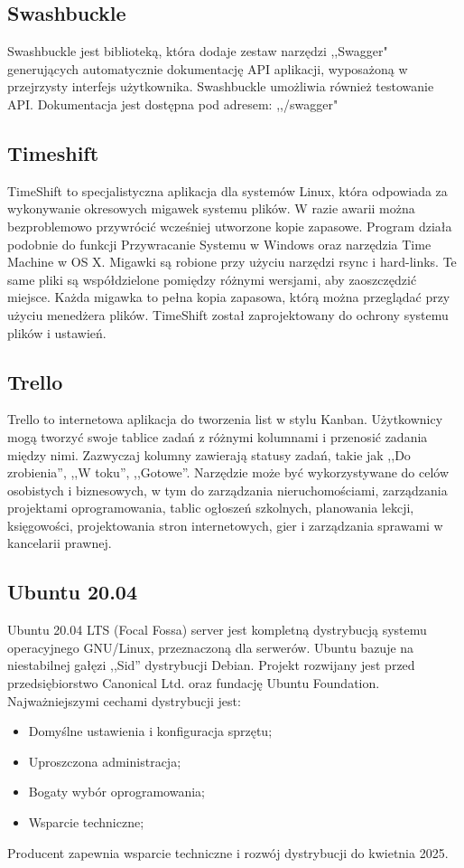 \documentclass[12pt,a4paper]{article}
\begin{document}
		\subsection{Swashbuckle}
			\indent Swashbuckle jest biblioteką, która dodaje zestaw narzędzi ,,Swagger" generujących automatycznie dokumentację API aplikacji,
				wyposażoną w przejrzysty interfejs użytkownika. Swashbuckle umożliwia również testowanie API. Dokumentacja jest dostępna pod adresem: ,,/swagger"
		
		\subsection{Timeshift}
			\indent TimeShift to specjalistyczna aplikacja dla systemów Linux, która odpowiada za wykonywanie okresowych migawek systemu plików.
			W razie awarii można bezproblemowo przywrócić wcześniej utworzone kopie zapasowe. Program działa podobnie do funkcji Przywracanie Systemu w Windows oraz narzędzia
			Time Machine w OS X. Migawki są robione przy użyciu narzędzi rsync i hard-links. Te same pliki są współdzielone pomiędzy różnymi wersjami, aby zaoszczędzić miejsce.
			Każda migawka to pełna kopia zapasowa, którą można przeglądać przy użyciu menedżera plików. TimeShift został zaprojektowany do ochrony systemu plików i ustawień.
			
		\subsection{Trello}
			\indent Trello to internetowa aplikacja do tworzenia list w stylu Kanban. Użytkownicy mogą tworzyć swoje tablice zadań z różnymi kolumnami i przenosić zadania
		między nimi. Zazwyczaj kolumny zawierają statusy zadań, takie jak ,,Do zrobienia'', ,,W toku'', ,,Gotowe''. Narzędzie może być wykorzystywane do celów osobistych i biznesowych,
		w tym do zarządzania nieruchomościami, zarządzania projektami oprogramowania, tablic ogłoszeń szkolnych, planowania lekcji, księgowości, projektowania stron internetowych,
		gier i zarządzania sprawami w kancelarii prawnej.
		
		\subsection{Ubuntu 20.04}		
		\indent Ubuntu 20.04 LTS (Focal Fossa) server jest kompletną dystrybucją systemu operacyjnego GNU/Linux, przeznaczoną dla serwerów. Ubuntu bazuje na niestabilnej gałęzi ,,Sid''
			dystrybucji Debian. Projekt rozwijany jest przed przedsiębiorstwo Canonical Ltd. oraz fundację Ubuntu Foundation. Najważniejszymi cechami dystrybucji jest:
			\begin{itemize}
				\item Domyślne ustawienia i konfiguracja sprzętu;
				\item Uproszczona administracja;
				\item Bogaty wybór oprogramowania;
				\item Wsparcie techniczne;
			\end{itemize}
			Producent zapewnia wsparcie techniczne i rozwój dystrybucji do kwietnia 2025.
			
\end{document}
